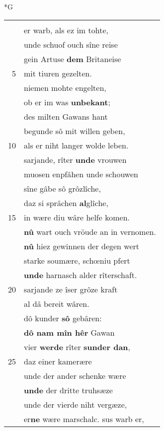 \documentclass[8pt,a4paper,notitlepage]{article}
\begin{document}
\begin{table}[ht]
\begin{minipage}[t]{0.5\linewidth}
\small
\begin{center}*G
\end{center}
\begin{tabular}{rl}
 & \textit{\begin{large}Ê\end{large}} siz selbe sehen mohte.\\ 
 & er warb, als ez im tohte,\\ 
 & unde schuof ouch sîne reise\\ 
 & gein Artuse \textbf{dem} Britaneise\\ 
5 & mit tiuren gezelten.\\ 
 & niemen mohte engelten,\\ 
 & ob er im was \textbf{unbekant};\\ 
 & des milten Gawans hant\\ 
 & begunde sô mit willen geben,\\ 
10 & als er niht langer wolde leben.\\ 
 & sarjande, rîter \textbf{unde} vrouwen\\ 
 & muosen enpfâhen unde schouwen\\ 
 & sîne gâbe sô grôzlîche,\\ 
 & daz si sprâchen \textbf{al}glîche,\\ 
15 & in wære diu wâre helfe komen.\\ 
 & \textbf{nû} wart ouch vröude an in vernomen.\\ 
 & \textbf{nû} hiez gewinnen der degen wert\\ 
 & starke soumære, schœniu pfert\\ 
 & \textbf{unde} harnasch alder rîterschaft.\\ 
20 & sarjande ze îser grôze kraft\\ 
 & al dâ bereit wâren.\\ 
 & dô kunder \textbf{sô} gebâren:\\ 
 & \textbf{dô nam mîn hêr} Gawan\\ 
 & vier \textbf{werde} rîter \textbf{sunder dan},\\ 
25 & daz einer kamerære\\ 
 & unde der ander schenke wære\\ 
 & \textbf{unde} der dritte truhsæze\\ 
 & unde der vierde niht vergæze,\\ 
 & er\textbf{ne} wære marschalc. sus warb er,\\ 

\end{tabular}
\end{minipage}
\end{table}
\end{document}
